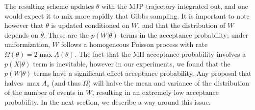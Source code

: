 The resulting scheme updates $\theta$ with the MJP trajectory integrated out, 
and one would expect it to mix more rapidly that Gibbs sampling. 
It is important to note however that $\theta$ is updated conditioned on
$W$, and that
the distribution of $W$ depends on $\theta$. These are the $p(W|\theta)$ terms
in the acceptance probability; under uniformization, $W$ follows a homogeneous
Poisson process with rate $\Omega(\theta) = 2 \max A(\theta)$. 
The fact that the MH-acceptance probability involves a $p(X|\theta)$ term
is inevitable, however in our experiments, we found that the $p(W|\theta)$
terms have a significant effect acceptance probability. 
Any proposal that halves $\max A_s$ (and thus $\Omega$) will halve the
mean and variance of the distribution of the number of events in $W$, 
resulting in an extremely low acceptance probability.
In the next section, we describe a way around this issue.
\setlength{\unitlength}{0.8cm}
